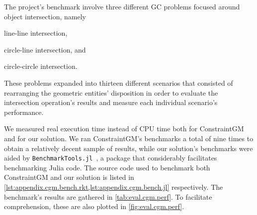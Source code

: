 The project's benchmark involve three different \ac{GC} problems focused around
object intersection, namely
\begin{enumerate*}[label= (\arabic*)]
  \item line-line intersection,
  \item circle-line intersection, and
  \item circle-circle intersection.
\end{enumerate*}
These problems expanded into thirteen different scenarios that consisted of
rearranging the geometric entities' disposition in order to evaluate the
intersection operation's results and measure each individual scenario's
performance.

We measured real execution time instead of \ac{CPU} time both for ConstraintGM
and for our solution.  We ran ConstraintGM's benchmarks a total of nine times to
obtain a relatively decent sample of results, while our solution's benchmarks
were aided by \texttt{BenchmarkTools.jl}~\cite{Chen:2016:BenchmarkTools.jl}, a
package that considerably facilitates benchmarking Julia code.  The source code
used to benchmark both ConstraintGM and our solution is listed in
\cref{lst:appendix.cgm.bench.rkt,lst:appendix.cgm.bench.jl} respectively.  The
benchmark's results are gathered in \cref{tab:eval.cgm.perf}.  To facilitate
comprehension, these are also plotted in \cref{fig:eval.cgm.perf}.

